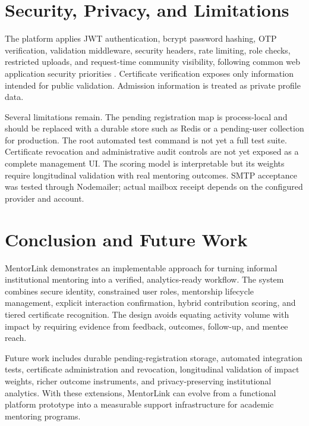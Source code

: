 \documentclass[conference]{IEEEtran}
\begin{document}
\section{Security, Privacy, and Limitations}
The platform applies JWT authentication, bcrypt password hashing, OTP verification, validation middleware, security headers, rate limiting, role checks, restricted uploads, and request-time community visibility, following common web application security priorities \cite{owasp2021}. Certificate verification exposes only information intended for public validation. Admission information is treated as private profile data.

Several limitations remain. The pending registration map is process-local and should be replaced with a durable store such as Redis or a pending-user collection for production. The root automated test command is not yet a full test suite. Certificate revocation and administrative audit controls are not yet exposed as a complete management UI. The scoring model is interpretable but its weights require longitudinal validation with real mentoring outcomes. SMTP acceptance was tested through Nodemailer; actual mailbox receipt depends on the configured provider and account.

\section{Conclusion and Future Work}
MentorLink demonstrates an implementable approach for turning informal institutional mentoring into a verified, analytics-ready workflow. The system combines secure identity, constrained user roles, mentorship lifecycle management, explicit interaction confirmation, hybrid contribution scoring, and tiered certificate recognition. The design avoids equating activity volume with impact by requiring evidence from feedback, outcomes, follow-up, and mentee reach.

Future work includes durable pending-registration storage, automated integration tests, certificate administration and revocation, longitudinal validation of impact weights, richer outcome instruments, and privacy-preserving institutional analytics. With these extensions, MentorLink can evolve from a functional platform prototype into a measurable support infrastructure for academic mentoring programs.



\end{document}
